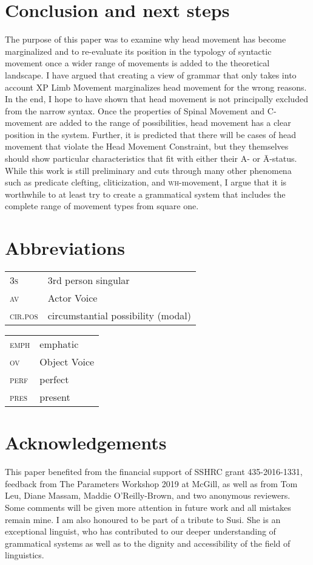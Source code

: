 \documentclass[output=paper,colorlinks,citecolor=brown,
]{langscibook}
\begin{document}
\section{Conclusion and next steps}

The purpose of this paper was to examine why head movement has become marginalized and to re-evaluate its position in the typology of syntactic movement once a wider range of movements is added to the theoretical landscape.  I have argued that creating a view of grammar that only takes into account XP Limb Movement marginalizes head movement for the wrong reasons.  In the end, I hope to have shown that head movement is not principally excluded from the narrow syntax.  Once the properties of Spinal Movement and C-movement are added to the range of possibilities, head movement has a clear position in the system.  Further, it is predicted that there will be cases of head movement that violate the Head Movement Constraint, but they themselves should show particular characteristics that fit with either their A- or \=A-status.  While this work is still preliminary and cuts through many other phenomena such as predicate clefting, cliticization, and \textsc{wh}-movement, I argue that it is worthwhile to at least try to create a grammatical system that includes the complete range of movement types from square one.

\section*{Abbreviations}
\begin{tabularx}{.5\textwidth}{lQ}
\textsc{3s} & 3rd person singular              \\
\textsc{av} & Actor Voice\\
\textsc{cir.pos} & circumstantial possibility (modal)   
\end{tabularx}
\begin{tabularx}{.5\textwidth}{lQ}
\textsc{emph} & emphatic\\
\textsc{ov} & Object Voice \\
\textsc{perf} & perfect \\
\textsc{pres} & present 
\end{tabularx}

\section*{Acknowledgements}
This paper benefited from the financial support of SSHRC grant 435-2016-1331, feedback from The Parameters Workshop 2019 at McGill, as well as from Tom Leu, Diane Massam, Maddie O'Reilly-Brown, and two anonymous reviewers.  Some comments will be given more attention in future work and all mistakes remain mine.  I am also honoured to be part of a tribute to Susi.  She is an exceptional linguist, who has contributed to our deeper understanding of grammatical systems as well as to the dignity and accessibility of the field of linguistics.


\printbibliography[heading=subbibliography,notkeyword=this]
\end{document}
